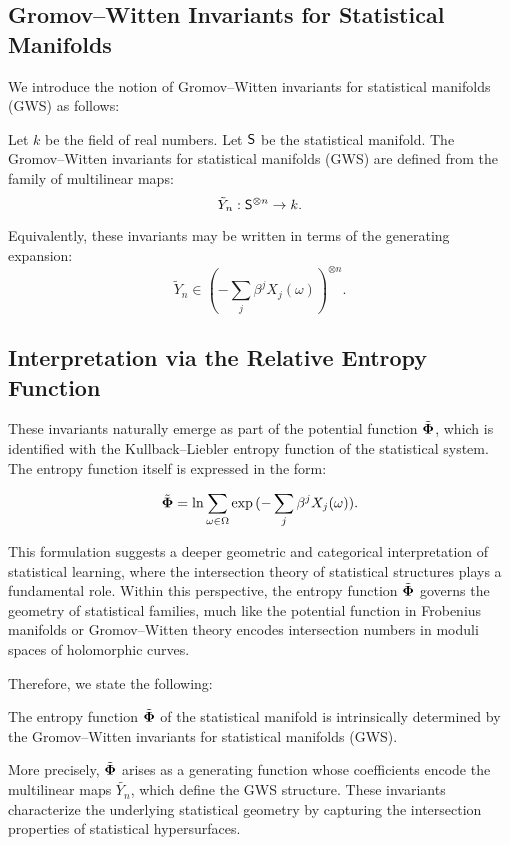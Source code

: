 \subsection{Gromov--Witten Invariants for Statistical Manifolds}
We introduce the notion of Gromov–Witten invariants for statistical manifolds (GWS) as follows:
\begin{definition}
Let $k$ be the field of real numbers. Let $\mathsf{S}$ be the statistical manifold. The Gromov--Witten invariants for statistical manifolds (GWS) are defined from the family of multilinear maps:
 \[\tilde{Y}_n:\mathsf{S}^{\otimes n}\to k.\] 
\end{definition}
Equivalently, these invariants may be written in terms of the generating expansion:
\[\tilde{Y}_n\in \left(-\sum_{j}\beta^jX_j(\omega)\right)^{\otimes n}.\]

\subsection{Interpretation via the Relative Entropy Function}
These invariants naturally emerge as part of the potential function
$\tilde{\bf \Phi}$, which is identified with the Kullback--Liebler entropy function of the statistical system. The entropy function itself is expressed in the form: 

\begin{equation}\label{E:3}\tilde{\bf \Phi}= \ln \sum_{\omega\in\Omega} \exp{(-\sum_{j}\beta^jX_j(\omega))}.\end{equation}

This formulation suggests a deeper geometric and categorical interpretation of statistical learning, where the intersection theory of statistical structures plays a fundamental role. Within this perspective, the entropy function $\tilde{\bf \Phi}$ governs the geometry of statistical families, much like the potential function in Frobenius manifolds or Gromov–Witten theory encodes intersection numbers in moduli spaces of holomorphic curves.

Therefore, we state the following:

\begin{proposition}
The entropy function $\tilde{\bf \Phi}$ of the statistical manifold is intrinsically determined by the Gromov–Witten invariants for statistical manifolds (GWS).
\end{proposition}
More precisely, $\tilde{\bf \Phi}$ arises as a generating function whose coefficients encode the multilinear maps $\tilde{Y_n}$, which define the GWS structure.  These invariants characterize the underlying statistical geometry by capturing the intersection properties of statistical hypersurfaces.


